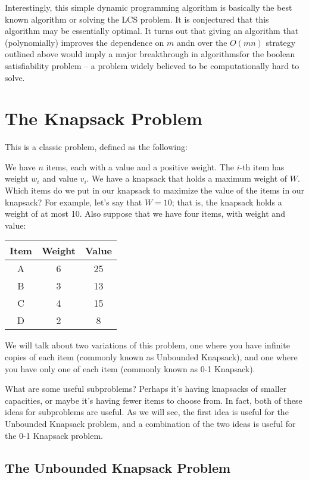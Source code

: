 \documentclass [12pt]{article}
\theoremstyle{definition}
\begin{document}
Interestingly, this simple dynamic programming algorithm is basically the best known algorithm or solving the LCS problem. It is conjectured that this algorithm may be essentially optimal. It turns out that giving an algorithm that (polynomially) improves the dependence on $m$ andn over the $O(mn)$ strategy outlined above would imply a major breakthrough in algorithmsfor the boolean satisfiability problem – a problem widely believed to be computationally hard to solve.

\section{The Knapsack Problem}
 
This is a classic problem, defined as the following:

We have $n$ items, each with a value and a positive weight. The $i$-th item has weight $w_i$ and value $v_i$. We have a knapsack that holds a maximum weight of $W$. Which items do we put in our knapsack to maximize the value of the items in our knapsack? For example, let’s say that $W = 10$; that is, the knapsack holds a weight of at most 10. Also suppose that we have four items, with weight and value:

\begin{table}[h!]
\centering
\begin{tabular}{c|c|c}
Item & Weight & Value \\
\hline
A & 6 &  25 \\
B & 3 & 13 \\
C & 4 & 15 \\
D & 2 & 8
\end{tabular}
\end{table}

We will talk about two variations of this problem, one where you have infinite copies of each item (commonly known as Unbounded Knapsack), and one where you have only one of each item (commonly known as 0-1 Knapsack). 

What are some useful subproblems? Perhaps it’s having knapsacks of smaller capacities, or maybe it’s having fewer items to choose from. In fact, both of these ideas for subproblems are useful. As we will see, the first idea is useful for the Unbounded Knapsack problem, and a combination of the two ideas is useful for the 0-1 Knapsack problem.

\subsection{The Unbounded Knapsack Problem} 
\end{document}
